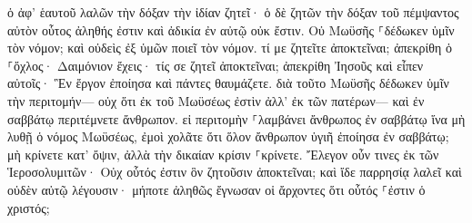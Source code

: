 \documentclass{openreader}
\begin{document}
ὁ ἀφ’ ἑαυτοῦ λαλῶν τὴν δόξαν τὴν ἰδίαν ζητεῖ· ὁ δὲ ζητῶν τὴν δόξαν τοῦ πέμψαντος αὐτὸν οὗτος ἀληθής ἐστιν καὶ ἀδικία ἐν αὐτῷ οὐκ ἔστιν. 
Οὐ Μωϋσῆς ⸀δέδωκεν ὑμῖν τὸν νόμον; καὶ οὐδεὶς ἐξ ὑμῶν ποιεῖ τὸν νόμον. τί με ζητεῖτε ἀποκτεῖναι; 
ἀπεκρίθη ὁ ⸀ὄχλος· Δαιμόνιον ἔχεις· τίς σε ζητεῖ ἀποκτεῖναι; 
ἀπεκρίθη Ἰησοῦς καὶ εἶπεν αὐτοῖς· Ἓν ἔργον ἐποίησα καὶ πάντες θαυμάζετε. 
διὰ τοῦτο Μωϋσῆς δέδωκεν ὑμῖν τὴν περιτομήν— οὐχ ὅτι ἐκ τοῦ Μωϋσέως ἐστὶν ἀλλ’ ἐκ τῶν πατέρων— καὶ ἐν σαββάτῳ περιτέμνετε ἄνθρωπον. 
εἰ περιτομὴν ⸀λαμβάνει ἄνθρωπος ἐν σαββάτῳ ἵνα μὴ λυθῇ ὁ νόμος Μωϋσέως, ἐμοὶ χολᾶτε ὅτι ὅλον ἄνθρωπον ὑγιῆ ἐποίησα ἐν σαββάτῳ; 
μὴ κρίνετε κατ’ ὄψιν, ἀλλὰ τὴν δικαίαν κρίσιν ⸀κρίνετε. 
Ἔλεγον οὖν τινες ἐκ τῶν Ἱεροσολυμιτῶν· Οὐχ οὗτός ἐστιν ὃν ζητοῦσιν ἀποκτεῖναι; 
καὶ ἴδε παρρησίᾳ λαλεῖ καὶ οὐδὲν αὐτῷ λέγουσιν· μήποτε ἀληθῶς ἔγνωσαν οἱ ἄρχοντες ὅτι οὗτός ⸀ἐστιν ὁ χριστός; 
\end{document}
